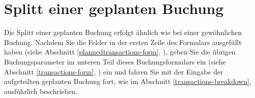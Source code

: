 \section{Splitt einer geplanten Buchung\label{plannedtransactions-breakdown}}

Die Splitt einer geplanten Buchung erfolgt ähnlich wie bei einer gewöhnlichen Buchung. Nachdem Sie die Felder in der ersten Zeile des Formulars ausgefüllt haben (siehe Abschnitt \vref{plannedtransactions-form}, ), geben Sie die übrigen Buchungsparameter im unteren Teil dieses Buchungsformulars ein (siehe Abschnitt \vref{transactions-form}, ) ein und fahren Sie mit der Eingabe der aufgeteilten geplanten Buchung fort, wie im Abschnitt \vref{transactions-breakdown},  ausführlich beschrieben.


